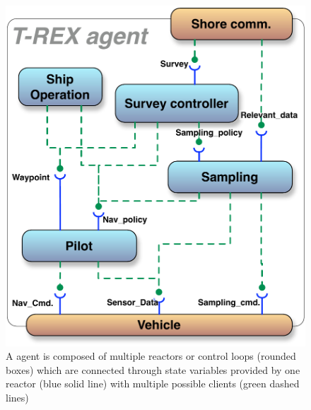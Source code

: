 

\begin{figure}[!htb]
 \centering
 \includegraphics[scale=0.45]{figs/AUV-agent.pdf}
 \caption{\small A \rx agent is composed of multiple reactors or
   control loops (rounded boxes) which are connected through state
   variables provided by one reactor ({\color{blue}blue} solid line)
   with multiple possible clients ({\color{green}green} dashed lines)}
  \label{fig:agent}
\end{figure}

